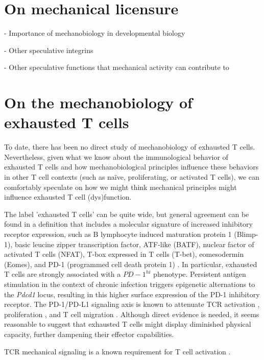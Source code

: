 \section{On mechanical licensure}

- Importance of mechanobiology in developmental biology

- Other speculative integrins

- Other speculative functions that mechanical activity can contribute to

\section{On the mechanobiology of exhausted T cells}

To date, there has been no direct study of mechanobiology of exhausted T cells. Nevertheless, given what we know about the immunological behavior of exhausted T cells and how mechanobiological principles influence these behaviors in other T cell contexts (such as na{\"i}ve, proliferating, or activated T cells), we can comfortably speculate on how we might think mechanical principles might influence exhausted T cell (dys)function.

The label 'exhausted T cells' can be quite wide, but general agreement can be found in a definition that includes a molecular signature of increased inhibitory receptor expression, such as B lymphocyte induced maturation protein 1 (Blimp-1), basic leucine zipper transcription factor, ATF-like (BATF), nuclear factor of activated T cells (NFAT), T-box expressed in T cells (T-bet), eomesodermin (Eomes), and PD-1 (programmed cell death protein 1) \cite{Wherry2011, Quigley2010, Doering2012, Wherry2007, Wang2012, Rangachari2012, Shin2009, Paley2012, Larsson2013}. In particular, exhausted T cells are strongly associated with a $PD-1^{hi}$ phenotype. Persistent antigen stimulation in the context of chronic infection triggers epigenetic alternations to the \textit{Pdcd1} locus, resulting in this higher surface expression of the PD-1 inhibitory receptor. The PD-1/PD-L1 signaling axis is known to attenuate TCR activation \cite{Mizuno2019}, proliferation \cite{Schietinger2014}, and T cell migration \cite{Zinselmeyer2013}. Although direct evidence is needed, it seems reasonable to suggest that exhausted T cells might display diminished physical capacity, further dampening their effector capabilities.

TCR mechanical signaling is a known requirement for T cell activation \cite{Hu2016}.

